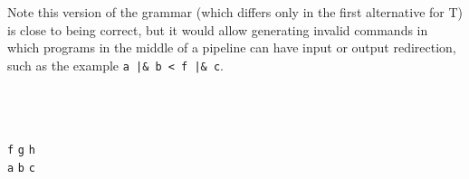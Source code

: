 \documentclass[11pt,fleqn]{article}
\begin{document}
\begin{enumerate}
\begin{multicols}{2}
\begin{minipage}[t]{2.9in}
\begin{grammar}[2]
                \\

                \\

              \end{grammar}

            \end{minipage}

          \end{multicols}

          \begin{multicols}{2}

            Note this version of the grammar (which differs only in the
            first alternative for T) is close to being correct, but it would
            allow generating invalid commands in which programs in the
            middle of a pipeline can have input or output redirection, such
            as the example \texttt{a |\& b < f |\& c}.

            \smallskip

            \hspace{.2in}
            \begin{minipage}[t]{2.9in}

              \begin{grammar}[2]

                \\

                \\

                \\

                           {\texttt{f} \midspc \texttt{g} \midspc \texttt{h}}
                \\

                           {\texttt{a} \midspc \texttt{b} \midspc \texttt{c}}
                \\

              \end{grammar}

            \end{minipage}


\end{multicols}
\end{enumerate}
\end{document}
